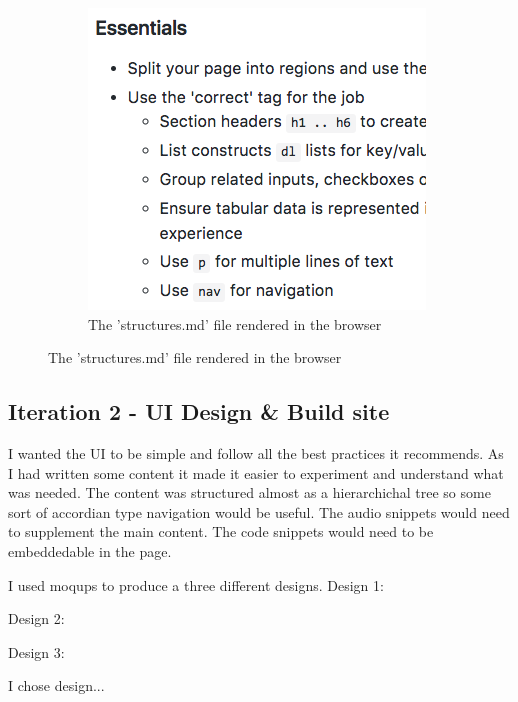 \begin{figure}[H]
\begin{subfigure}[b]{0.4\textwidth}
        \includegraphics[width=\textwidth]{figures/documentation_md_example_2}
        \captionsetup{justification=centering}
        \caption{The 'structures.md' file rendered in the browser}
        \label{fig:structures}
    \end{subfigure}
\end{figure}

\subsection{Iteration 2 - UI Design \& Build site}
I wanted the UI to be simple and follow all the best practices it recommends.
As I had written some content it made it easier to experiment and understand
what was needed. The content was structured almost as a hierarchichal tree so
some sort of accordian type navigation would be useful. The audio snippets
would need to supplement the main content. The code snippets
would need to be embeddedable in the page.

I used moqups to produce a three different designs.
Design 1:

Design 2:

Design 3:

I chose design...

